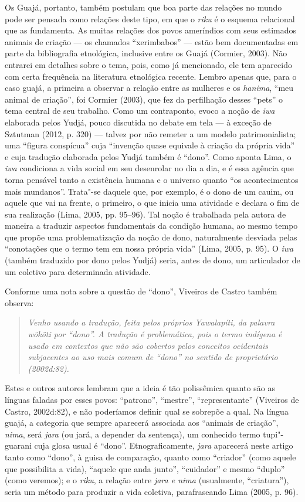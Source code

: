 Os Guajá, portanto, também postulam que boa parte das relações no mundo
pode ser pensada como relações deste tipo, em que o \emph{riku} é o
esquema relacional que as fundamenta. As muitas relações dos povos
ameríndios com seus estimados animais de criação --- os chamados
``xerimbabos'' --- estão bem documentadas em parte da bibliografia
etnológica, inclusive entre os Guajá (Cormier, 2003). Não entrarei em
detalhes sobre o tema, pois, como já mencionado, ele tem aparecido com
certa frequência na literatura etnológica recente. Lembro apenas que,
para o caso guajá, a primeira a observar a relação entre as mulheres e
os \emph{hanima}, ``meu animal de criação'', foi Cormier (2003), que fez
da perfilhação desses ``pets'' o tema central de seu trabalho. Como um
contraponto, evoco a noção de \emph{iwa} elaborada pelos Yudjá, pouco
discutida no debate em tela --- à exceção de Sztutman (2012, p. 320) --- talvez
por não remeter a um modelo patrimonialista; uma ``figura conspícua'' cuja
``invenção quase equivale à criação da própria vida'' e cuja tradução
elaborada pelos Yudjá também é ``dono''. Como aponta Lima, o \emph{iwa}
condiciona a vida social em seu desenrolar no dia a dia, e é essa
agência que torna pensável tanto a existência humana e o universo quanto
``os acontecimentos mais mundanos''. Trata"-se daquele que, por exemplo,
é o dono de um cauim, ou aquele que vai na frente, o primeiro, o que
inicia uma atividade e declara o fim de sua realização (Lima,
2005, pp. 95--96). Tal noção é trabalhada pela autora de maneira a traduzir
aspectos fundamentais da condição humana, ao mesmo tempo que propõe uma
problematização da noção de dono, naturalmente desviada pelas
``conotações que o termo tem em nossa própria vida'' (Lima, 2005, p. 95). O
\emph{iwa} (também traduzido por dono pelos Yudjá) seria, antes de dono,
um articulador de um coletivo para determinada atividade.

Conforme uma nota sobre a questão de ``dono'', Viveiros de Castro também
observa:

\begin{quote}
\emph{Venho usando a tradução, feita pelos próprios Yawalapíti, da palavra
\emph{wököti} por ``dono''. A tradução é problemática, pois o termo indígena é usado em
contextos que não são cobertos pelos conceitos ocidentais subjacentes ao uso mais
comum de ``dono'' no sentido de proprietário (2002d:82).}
\end{quote}

Estes e outros autores lembram que a ideia é tão polissêmica quanto são
as línguas faladas por esses povos: ``patrono'', ``mestre'', ``representante''
(Viveiros de Castro, 2002d:82), e não poderíamos definir qual se sobrepõe
a qual. Na língua guajá, a categoria que sempre aparecerá associada aos
``animais de criação'', \emph{nima}, será \emph{jara} (ou jará, a depender
da sentença), um conhecido termo tupi"-guarani cuja glosa usual é ``dono''.
Etnograficamente, \emph{jara} aparecerá neste artigo tanto como ``dono'',
à guisa de comparação, quanto como ``criador'' (como aquele que
possibilita a vida), ``aquele que anda junto'', ``cuidador'' e mesmo ``duplo''
(como veremos); e o \emph{riku}, a relação entre \emph{jara e nima}
(usualmente, ``criatura''), seria um método para produzir a vida
coletiva, parafraseando Lima (2005, p. 96).

